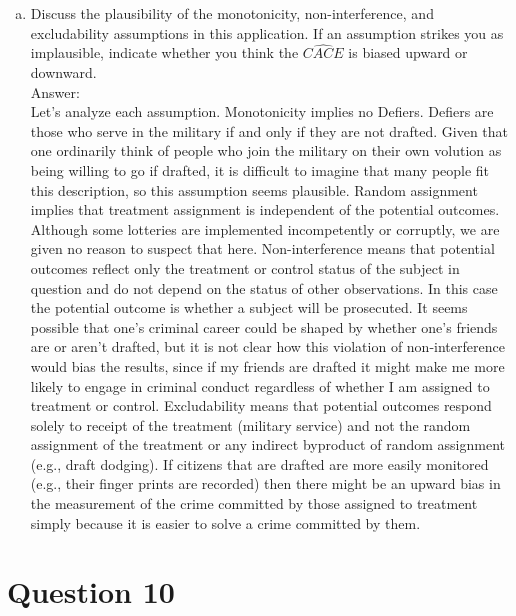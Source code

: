 \documentclass[11pt,notitlepage]{article}\usepackage[]{graphicx}\usepackage[]{color}
\makeatletter
\newenvironment{kframe}{%
 \def\at@end@of@kframe{}%
 \ifinner\ifhmode%
  \def\at@end@of@kframe{\end{minipage}}%
  \begin{minipage}{\columnwidth}%
 \fi\fi%
 \def\FrameCommand##1{\hskip\@totalleftmargin \hskip-\fboxsep
 \colorbox{shadecolor}{##1}\hskip-\fboxsep
     \hskip-\linewidth \hskip-\@totalleftmargin \hskip\columnwidth}%
 \MakeFramed {\advance\hsize-\width
   \@totalleftmargin\z@ \linewidth\hsize
   \@setminipage}}%
 {\par\unskip\endMakeFramed%
 \at@end@of@kframe}
\newenvironment{knitrout}{}{} %
\makeatother
\begin{document}
\begin{enumerate}[a)]
\item Discuss the plausibility of the monotonicity, non-interference, and excludability assumptions in this application. If an assumption strikes you as implausible, indicate whether you think the $\widehat{CACE}$ is biased upward or downward. \\
Answer:\\
Let's analyze each assumption. Monotonicity implies no Defiers. Defiers are those who serve in the military if and only if they are not drafted. Given that one ordinarily think of people who join the military on their own volution as being willing to go if drafted, it is difficult to imagine that many people fit this description, so this assumption seems plausible. Random assignment implies that treatment assignment is independent of the potential outcomes. Although some lotteries are implemented incompetently or corruptly, we are given no reason to suspect that here. Non-interference means that potential outcomes reflect only the treatment or control status of the subject in question and do not depend on the status of other observations. In this case the potential outcome is whether a subject will be prosecuted. It seems possible that one's criminal career could be shaped by whether one's friends are or aren't drafted, but it is not clear how this violation of non-interference would bias the results, since if my friends are drafted it might make me more likely to engage in criminal conduct regardless of whether I am assigned to treatment or control. Excludability means that potential outcomes respond solely to receipt of the treatment (military service) and not the random assignment of the treatment or any indirect byproduct of random assignment (e.g., draft dodging). If citizens that are drafted are more easily monitored (e.g., their finger prints are recorded) then there might be an upward bias in the measurement of the crime committed by those assigned to treatment simply because it is easier to solve a crime committed by them. 
\end{enumerate}

\section*{Question 10}
\begin{knitrout}
\color{fgcolor}\begin{kframe}
\begin{verbatim}






\end{verbatim}
\end{kframe}
\end{knitrout}
\end{document}
